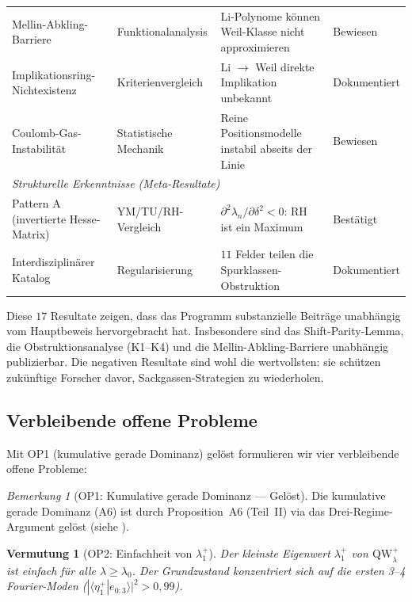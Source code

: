 \documentclass[12pt,a4paper]{article}
\newtheorem{conjecture}[theorem]{Vermutung}
\theoremstyle{definition}
\theoremstyle{remark}
\newtheorem{remark}[theorem]{Bemerkung}
\begin{document}
\begin{center}
{\begin{tabular}{p{4.2cm}|p{3.2cm}|p{4.2cm}|l}
Mellin-Abkling-Barriere & Funktionalanalysis & Li-Polynome können Weil-Klasse nicht approximieren & Bewiesen \\
Implikationsring-Nichtexistenz & Kriterienvergleich & Li $\to$ Weil direkte Implikation unbekannt & Dokumentiert \\
Coulomb-Gas-Instabilität & Statistische Mechanik & Reine Positionsmodelle instabil abseits der Linie & Bewiesen \\[4pt]
\multicolumn{4}{l}{\emph{Strukturelle Erkenntnisse (Meta-Resultate)}} \\[2pt]
Pattern A (invertierte Hesse-Matrix) & YM/TU/RH-Vergleich & $\partial^2\lambda_n/\partial\delta^2 < 0$: RH ist ein Maximum & Bestätigt \\
Interdisziplinärer Katalog & Regularisierung & $11$ Felder teilen die Spurklassen-Obstruktion & Dokumentiert
\end{tabular}}
\end{center}

\noindent Diese $17$ Resultate zeigen, dass das Programm substanzielle Beiträge unabhängig vom Hauptbeweis hervorgebracht hat. Insbesondere sind das Shift-Parity-Lemma, die Obstruktionsanalyse (K1--K4) und die Mellin-Abkling-Barriere unabhängig publizierbar. Die negativen Resultate sind wohl die wertvollsten: sie schützen zukünftige Forscher davor, Sackgassen-Strategien zu wiederholen.


\subsection{Verbleibende offene Probleme}

Mit OP1 (kumulative gerade Dominanz) gelöst formulieren wir vier verbleibende offene Probleme:

\begin{remark}[OP1: Kumulative gerade Dominanz --- Gelöst]
\label{rem:OP1-resolved}
Die kumulative gerade Dominanz (A6) ist durch Proposition~A6 (Teil~II) via das Drei-Regime-Argument gelöst (siehe ).
\end{remark}

\begin{conjecture}[OP2: Einfachheit von $\lambda_1^+$]
\label{conj:OP2}
Der kleinste Eigenwert $\lambda_1^+$ von $\mathrm{QW}_\lambda^+$ ist einfach für alle $\lambda \geq \lambda_0$. Der Grundzustand konzentriert sich auf die ersten 3--4 Fourier-Moden ($|\langle \eta_1^+ | e_{0:3} \rangle|^2 > 0{,}99$).
\end{conjecture}
\end{document}
